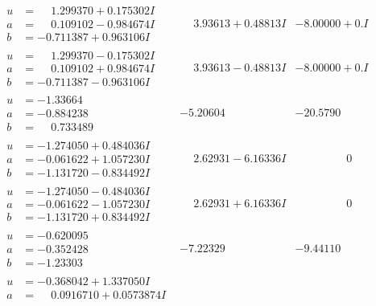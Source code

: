 \documentclass[1p]{elsarticle_modified}
\theoremstyle{definition}
\begin{document}
$$\begin{array}{c|c|c}
\begin{aligned}
u &= \phantom{-}1.299370 + 0.175302 I \\
a &= \phantom{-}0.109102 - 0.984674 I \\
b &= -0.711387 + 0.963106 I\end{aligned}
 & \phantom{-}3.93613 + 0.48813 I & -8.00000 + 0. I\phantom{ +0.000000I} \\ \hline\begin{aligned}
u &= \phantom{-}1.299370 - 0.175302 I \\
a &= \phantom{-}0.109102 + 0.984674 I \\
b &= -0.711387 - 0.963106 I\end{aligned}
 & \phantom{-}3.93613 - 0.48813 I & -8.00000 + 0. I\phantom{ +0.000000I} \\ \hline\begin{aligned}
u &= -1.33664\phantom{ +0.000000I} \\
a &= -0.884238\phantom{ +0.000000I} \\
b &= \phantom{-}0.733489\phantom{ +0.000000I}\end{aligned}
 & -5.20604\phantom{ +0.000000I} & -20.5790\phantom{ +0.000000I} \\ \hline\begin{aligned}
u &= -1.274050 + 0.484036 I \\
a &= -0.061622 + 1.057230 I \\
b &= -1.131720 - 0.834492 I\end{aligned}
 & \phantom{-}2.62931 - 6.16336 I & \phantom{-0.000000 } 0 \\ \hline\begin{aligned}
u &= -1.274050 - 0.484036 I \\
a &= -0.061622 - 1.057230 I \\
b &= -1.131720 + 0.834492 I\end{aligned}
 & \phantom{-}2.62931 + 6.16336 I & \phantom{-0.000000 } 0 \\ \hline\begin{aligned}
u &= -0.620095\phantom{ +0.000000I} \\
a &= -0.352428\phantom{ +0.000000I} \\
b &= -1.23303\phantom{ +0.000000I}\end{aligned}
 & -7.22329\phantom{ +0.000000I} & -9.44110\phantom{ +0.000000I} \\ \hline\begin{aligned}
u &= -0.368042 + 1.337050 I \\
a &= \phantom{-}0.0916710 + 0.0573874 I \\

\end{aligned}
\end{array}$$
\end{document}
